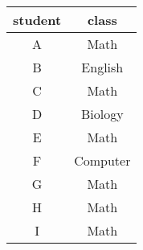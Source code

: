 \begin{tabular}{|c|c|}
    \hline
        \textbf{student} & \textbf{class} \\ \hline
        A & Math \\ 
        B & English \\ 
        C & Math \\ 
        D & Biology \\ 
        E & Math \\ 
        F & Computer \\ 
        G & Math \\ 
        H & Math \\ 
        I & Math \\ \hline
\end{tabular}
